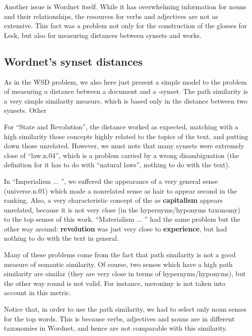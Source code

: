 \documentclass{pnastwo}
\begin{document}
\begin{article}
Another issue is Wordnet itself. While it has overwhelming information for nouns and their relationships, the resources for verbs and adjectives are not as extensive. This fact was a problem not only for the construction of the glosses for Lesk, but also for measuring distances between synsets and works.

\subsection{Wordnet's synset distances}

As in the WSD problem, we also here just present a simple model to the problem of measuring a distance between a document and a -synset. The path similarity is a very simple similarity measure, which is based only in the distance between two synsets. Other 

For ``State and Revolution'', the distance worked as expected, matching with a high similarity those concepts highly related to the topics of the text, and putting down those unrelated. However, we must note that many synsets were extremely close of ``law.n.04'', which is a problem carried by a wrong disambiguation (the definition for it has to do with ``natural laws'', nothing to do with the text).

In ``Imperialism ... '', we suffered the appearance of a very general sense (universe.n.01) which made a nonrelated sense as hair to appear second in the ranking. Also, a very characteristic concept of the  as \textbf{capitalism} appears unrelated, because it is not very close (in the hypernyms/hyponyms taxonomy) to the top senses of this work. ``Materialism ... '' had the same problem but the other way around: \textbf{revolution} was just very close to \textbf{experience}, but had nothing to do with the text in general.

Many of these problems come from the fact that path similarity is not a good measure of semantic similarity. Of course, two senses which have a high path similarity are similar (they are very close in terms of hypernyms/hyponyms), but the other way round is not valid. For instance, meronimy is not taken into account in this metric.
 
Notice that, in order to use the path similarity, we had to select only noun senses for the top words. This is because verbs, adjectives and nouns are in different taxonomies in Wordnet, and hence are not comparable with this similarity. 






\end{article}
\end{document}
